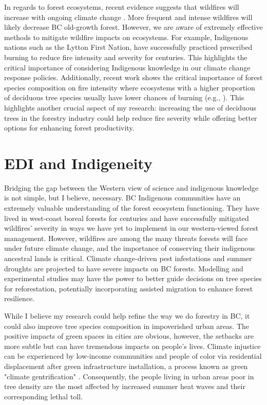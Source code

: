\documentclass[11pt,letter]{article}
\begin{document}
In regards to forest ecosystems, recent evidence suggests that wildfires will increase with ongoing climate change \citep{wasserman_climate_2023}. More frequent and intense wildfires will likely decrease BC old-growth forest. \citep{price_conflicting_2021} However, we are aware of extremely effective methods to mitigate wildfire impacts on ecosystems. For example, Indigenous nations such as the Lytton First Nation, have successfully practiced prescribed burning to reduce fire intensity and severity for centuries. \citep{lewis_return_2018} This highlights the critical importance of considering Indigenous knowledge in our climate change response policies. Additionally, recent work shows the critical importance of forest species composition on fire intensity where ecosystems with a higher proportion of deciduous tree species usually have lower chances of burning (e.g., \citep{park_impact_2024}). This highlights another crucial aspect of my research: increasing the use of deciduous trees in the forestry industry could help reduce fire severity while offering better options for enhancing forest productivity.



\section *{EDI and Indigeneity}
Bridging the gap between the Western view of science and indigenous knowledge is not simple, but I believe, necessary. BC Indigenous communities have an extremely valuable understanding of the forest ecosystem functioning. They have lived in west-coast boreal forests for centuries and have successfully mitigated wildfires' severity in ways we have yet to implement in our western-viewed forest management. However, wildfires are among the many threats forests will face under future climate change, and the importance of conserving their indigenous ancestral lands is critical. Climate change-driven pest infestations and summer droughts are projected to have severe impacts on BC forests. \citep{williams_climate_2002} Modelling and experimental studies may have the power to better guide decisions on tree species for reforestation, potentially incorporating assisted migration to enhance forest resilience. \citep{aitken_time_2016}

While I believe my research could help refine the way we do forestry in BC, it could also improve tree species composition in impoverished urban areas. The positive impacts of green spaces in cities are obvious, however, the setbacks are more subtle but can have tremendous impacts on people's lives. Climate injustice can be experienced by low-income communities and people of color via residential displacement after green infrastructure installation, a process known as green "climate gentrification" \citep{anguelovski_why_2019}. Consequently, the people living in urban areas poor in tree density are the most affected by increased summer heat waves and their corresponding lethal toll. \citep{anguelovski_why_2019}
\end{document}
